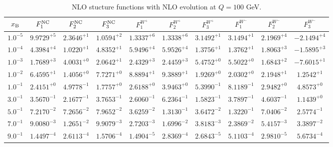 \begin{table}[h]
\begin{adjustbox}{width=\textwidth}
\begin{tabular}{|c||c|c|c|c|c|c|c|c|c|}
\hline
$x_{\rm B}$ & $F_1^{\rm NC}$ & $F_2^{\rm NC}$ & $F_3^{\rm NC}$ & $F_1^{W^+}$ & $F_2^{W^+}$ & $F_3^{W^+}$ & $F_1^{W^-}$ & $F_2^{W^-}$ & $F_3^{W^-}$ \\
\hline
$ 1.0^{-5}$ & $ 9.9729^{+5}$ & $ 2.3646^{+1}$ & $ 1.0594^{+2}$ & $ 1.3337^{+6}$ & $ 1.3338^{+6}$ & $ 3.1492^{+1}$ & $ 3.1494^{+1}$ & $ 2.1969^{+4}$ & $-2.1494^{+4}$ \\
$ 1.0^{-4}$ & $ 4.3984^{+4}$ & $ 1.0220^{+1}$ & $ 4.8352^{+1}$ & $ 5.9496^{+4}$ & $ 5.9526^{+4}$ & $ 1.3756^{+1}$ & $ 1.3762^{+1}$ & $ 1.8063^{+3}$ & $-1.5895^{+3}$ \\
$ 1.0^{-3}$ & $ 1.7689^{+3}$ & $ 4.0031^{+0}$ & $ 2.0642^{+1}$ & $ 2.4329^{+3}$ & $ 2.4459^{+3}$ & $ 5.4752^{+0}$ & $ 5.5022^{+0}$ & $ 1.6843^{+2}$ & $-7.6015^{+1}$ \\
$ 1.0^{-2}$ & $ 6.4595^{+1}$ & $ 1.4056^{+0}$ & $ 7.7271^{+0}$ & $ 8.8894^{+1}$ & $ 9.3889^{+1}$ & $ 1.9269^{+0}$ & $ 2.0302^{+0}$ & $ 2.1948^{+1}$ & $ 1.2542^{+1}$ \\
$ 1.0^{-1}$ & $ 2.4151^{+0}$ & $ 4.9778^{-1}$ & $ 1.7757^{+0}$ & $ 2.6188^{+0}$ & $ 3.9463^{+0}$ & $ 5.3990^{-1}$ & $ 8.1189^{-1}$ & $ 2.9482^{+0}$ & $ 4.8573^{+0}$ \\
$ 3.0^{-1}$ & $ 3.5670^{-1}$ & $ 2.1677^{-1}$ & $ 3.7653^{-1}$ & $ 2.6060^{-1}$ & $ 6.2364^{-1}$ & $ 1.5823^{-1}$ & $ 3.7897^{-1}$ & $ 4.6037^{-1}$ & $ 1.1439^{+0}$ \\
$ 5.0^{-1}$ & $ 7.2170^{-2}$ & $ 7.2656^{-2}$ & $ 7.9652^{-2}$ & $ 3.6259^{-2}$ & $ 1.3130^{-1}$ & $ 3.6472^{-2}$ & $ 1.3220^{-1}$ & $ 7.0406^{-2}$ & $ 2.5774^{-1}$ \\
$ 7.0^{-1}$ & $ 9.0080^{-3}$ & $ 1.2651^{-2}$ & $ 9.9079^{-3}$ & $ 2.7203^{-3}$ & $ 1.6996^{-2}$ & $ 3.8183^{-3}$ & $ 2.3869^{-2}$ & $ 5.4157^{-3}$ & $ 3.3897^{-2}$ \\
$ 9.0^{-1}$ & $ 1.4497^{-4}$ & $ 2.6113^{-4}$ & $ 1.5706^{-4}$ & $ 1.4904^{-5}$ & $ 2.8369^{-4}$ & $ 2.6843^{-5}$ & $ 5.1103^{-4}$ & $ 2.9810^{-5}$ & $ 5.6734^{-4}$ \\
\hline
\end{tabular}
\end{adjustbox}\caption{NLO stucture functions with NLO evolution at $Q = 100$ GeV.}
\label{tab:N1LO-Q100}
\end{table}


